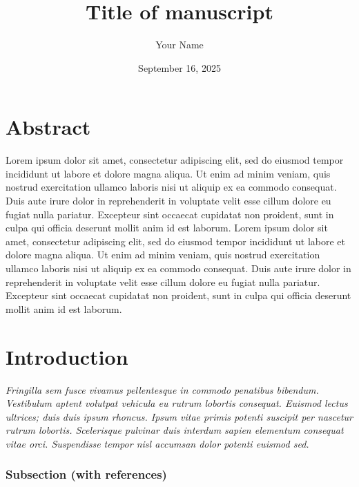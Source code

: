 \documentclass[
  a4paper,
]{scrbook}
\title{Title of manuscript}
\author{Your Name}
\date{September 16, 2025}
\renewcommand*\contentsname{Table of contents}
\newcommand\contentsname{Table of contents}
\begin{document}
\frontmatter
\maketitle

\renewcommand*\contentsname{Table of contents}
{
\setcounter{tocdepth}{1}
\tableofcontents
}

\mainmatter
\chapter{Abstract}\label{abstract}

Lorem ipsum dolor sit amet, consectetur adipiscing elit, sed do eiusmod
tempor incididunt ut labore et dolore magna aliqua. Ut enim ad minim
veniam, quis nostrud exercitation ullamco laboris nisi ut aliquip ex ea
commodo consequat. Duis aute irure dolor in reprehenderit in voluptate
velit esse cillum dolore eu fugiat nulla pariatur. Excepteur sint
occaecat cupidatat non proident, sunt in culpa qui officia deserunt
mollit anim id est laborum. Lorem ipsum dolor sit amet, consectetur
adipiscing elit, sed do eiusmod tempor incididunt ut labore et dolore
magna aliqua. Ut enim ad minim veniam, quis nostrud exercitation ullamco
laboris nisi ut aliquip ex ea commodo consequat. Duis aute irure dolor
in reprehenderit in voluptate velit esse cillum dolore eu fugiat nulla
pariatur. Excepteur sint occaecat cupidatat non proident, sunt in culpa
qui officia deserunt mollit anim id est laborum.

\chapter{Introduction}\label{introduction}

\emph{Fringilla sem fusce vivamus pellentesque in commodo penatibus
bibendum. Vestibulum aptent volutpat vehicula eu rutrum lobortis
consequat. Euismod lectus ultrices; duis duis ipsum rhoncus. Ipsum vitae
primis potenti suscipit per nascetur rutrum lobortis. Scelerisque
pulvinar duis interdum sapien elementum consequat vitae orci.
Suspendisse tempor nisl accumsan dolor potenti euismod sed.}

\subsection{Subsection (with
references)}\label{subsection-with-references}
\end{document}
